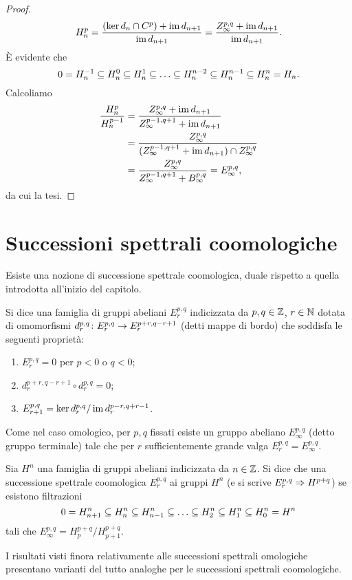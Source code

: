 \begin{proof}
$$
H^p_n=\frac{(\ker d_n\cap C^p)+\operatorname{im} d_{n+1}}{\operatorname{im} d_{n+1}}=\frac{Z^{p,q}_\infty+\operatorname{im} d_{n+1}}{\operatorname{im} d_{n+1}}.
$$
È evidente che
$$
0=H^{-1}_n\subseteq H^0_n\subseteq H^1_n\subseteq\ldots\subseteq H^{n-2}_n\subseteq H^{n-1}_n\subseteq H^n_n=H_n.
$$
Calcoliamo
\begin{align*}
\frac{H^p_n}{H^{p-1}_n}&=\frac{Z^{p,q}_\infty+\operatorname{im} d_{n+1}}{Z^{p-1,q+1}_\infty+\operatorname{im} d_{n+1}}\\
&=\frac{Z^{p,q}_\infty}{(Z^{p-1,q+1}_\infty+\operatorname{im} d_{n+1})\cap Z^{p,q}_\infty}\\
&=\frac{Z^{p,q}_\infty}{Z^{p-1,q+1}_\infty+B^{p,q}_\infty}=E^{p,q}_\infty,
\end{align*}
da cui la tesi.
\end{proof}

\section{Successioni spettrali coomologiche}

Esiste una nozione di successione spettrale coomologica, duale rispetto a quella introdotta all'inizio del capitolo.

\begin{definition}
Si dice  una famiglia di gruppi abeliani $E^{p,q}_r$ indicizzata da $p,q\in\mathbb{Z}$, $r\in\mathbb{N}$ dotata di omomorfismi $\map{d^{p,q}_r}{E^{p,q}_r}{E^{p+r,q-r+1}_r}$ (detti mappe di bordo) che soddisfa le seguenti proprietà:
\begin{enumerate}
\item $E^{p,q}_r=0$ per $p<0$ o $q<0$;
\item $d^{p+r,q-r+1}_r\circ d^{p,q}_r=0$;
\item $E^{p,q}_{r+1}=\ker d^{p,q}_r/\operatorname{im} d^{p-r,q+r-1}_r$.
\end{enumerate}
\end{definition}
Come nel caso omologico, per $p,q$ fissati esiste un gruppo abeliano $E^{p,q}_\infty$ (detto gruppo terminale) tale che per $r$ sufficientemente grande valga $E^{p,q}_r=E^{p,q}_\infty$.
\begin{definition}
Sia $H^n$ una famiglia di gruppi abeliani indicizzata da $n\in\mathbb{Z}$.
Si dice che una successione spettrale coomologica $E^{p,q}_r$  ai gruppi $H^n$ (e si scrive $E^{p,q}_r\Rightarrow H^{p+q}$) se esistono filtrazioni
$$
0=H^n_{n+1}\subseteq H^n_n\subseteq H^n_{n-1}\subseteq\ldots\subseteq H^n_2\subseteq H^n_1\subseteq H^n_0=H^n
$$
tali che $E^{p,q}_\infty=H^{p+q}_p/H^{p+q}_{p+1}$.
\end{definition}
I risultati visti finora relativamente alle successioni spettrali omologiche presentano varianti del tutto analoghe per le successioni spettrali coomologiche.
